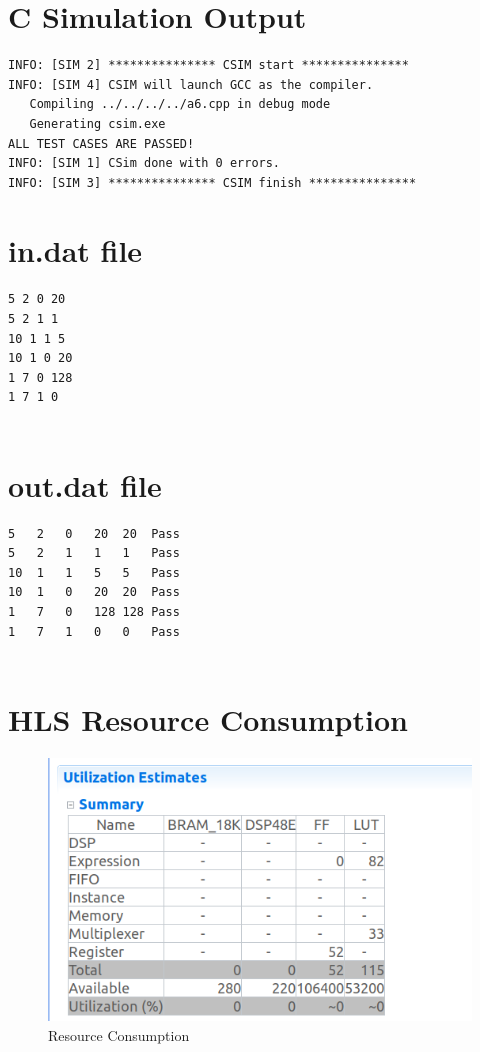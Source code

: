 \documentclass{article}
\begin{document}
\section{C Simulation Output}
\begin{lstlisting}
INFO: [SIM 2] *************** CSIM start ***************
INFO: [SIM 4] CSIM will launch GCC as the compiler.
   Compiling ../../../../a6.cpp in debug mode
   Generating csim.exe
ALL TEST CASES ARE PASSED!
INFO: [SIM 1] CSim done with 0 errors.
INFO: [SIM 3] *************** CSIM finish ***************

\end{lstlisting}
\vspace{3cm}
\section{in.dat file}
\begin{lstlisting}
5 2 0 20
5 2 1 1
10 1 1 5
10 1 0 20
1 7 0 128
1 7 1 0


\end{lstlisting}
\vspace{3cm}
\section{out.dat file}
\begin{lstlisting}
5	2	0	20	20	Pass
5	2	1	1	1	Pass
10	1	1	5	5	Pass
10	1	0	20	20	Pass
1	7	0	128	128	Pass
1	7	1	0	0	Pass


\end{lstlisting}
\vspace{15cm}


\section{HLS Resource Consumption}
\vspace{3cm}
\begin{figure}[h]
    \centering
\includegraphics[width=\columnwidth]{1.png}
    \caption{Resource Consumption}
    \label{fig:my_label}
\end{figure}
\end{document}
